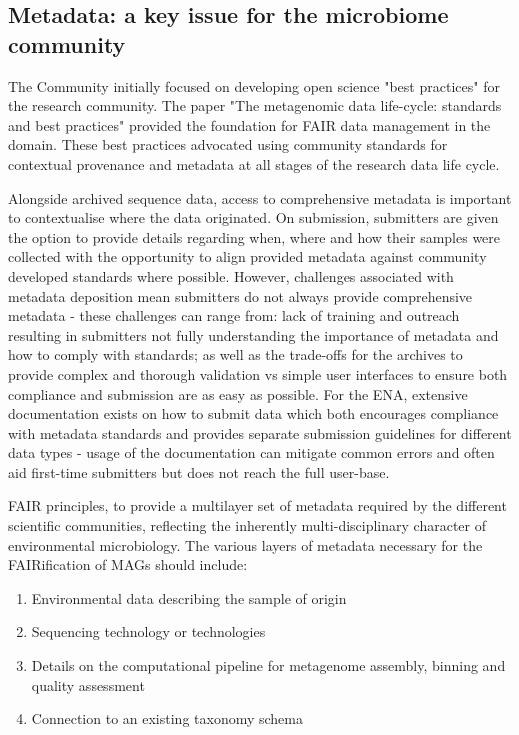 \subsection{Metadata: a key issue for the microbiome community}

   The Community initially focused on developing open science "best practices" for the research community. 
   The paper "The metagenomic data life-cycle: standards and best practices" \citep{ten2017metagenomic} provided the foundation for FAIR data management in the domain. 
   These best practices advocated using community standards for contextual provenance and metadata at all stages of the research data life cycle.

   Alongside archived sequence data, access to comprehensive metadata is important to contextualise where the data originated. 
   On submission, submitters are given the option to provide details regarding when, where and how their samples were collected with the opportunity to align provided metadata against community developed standards where possible. 
   However, challenges associated with metadata deposition mean submitters do not always provide comprehensive metadata - these challenges can range from: 
   lack of training and outreach resulting in submitters not fully understanding the importance of metadata and how to comply with standards; 
   as well as the trade-offs for the archives to provide complex and thorough validation vs simple user interfaces to ensure both compliance and submission are as easy as possible. 
   For the ENA, extensive documentation exists on how to submit data which both encourages compliance with metadata standards and provides separate submission guidelines for different data types - usage of the documentation can mitigate common errors and often aid first-time submitters but does not reach the full user-base. 

   FAIR principles, to provide a multilayer set of metadata required by the different scientific communities, reflecting the inherently multi-disciplinary character of environmental microbiology. 
   The various layers of metadata necessary for the FAIRification of MAGs should include:
   \begin{enumerate}
      \item Environmental data describing the sample of origin
      \item Sequencing technology or technologies
      \item Details on the computational pipeline for metagenome assembly, binning and quality assessment
      \item Connection to an existing taxonomy schema
   \end{enumerate}


